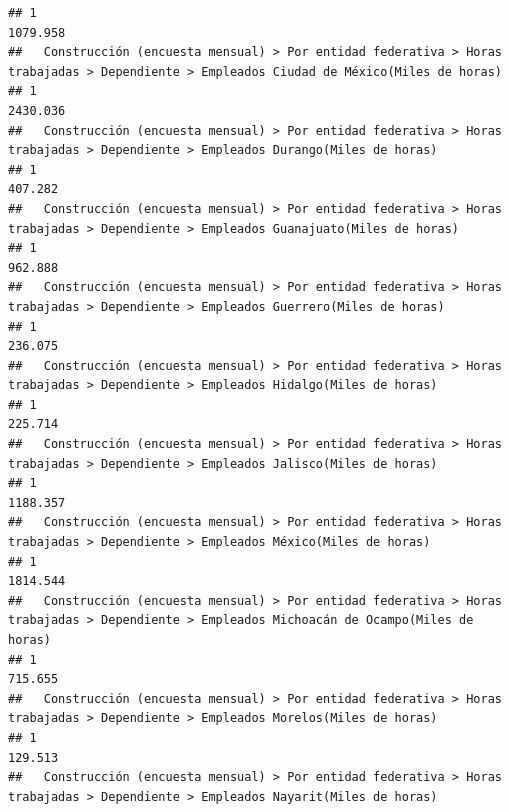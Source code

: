 \documentclass[
]{article}
\begin{document}
\begin{verbatim}
## 1                                                                                                                         1079.958
##   Construcción (encuesta mensual) > Por entidad federativa > Horas trabajadas > Dependiente > Empleados Ciudad de México(Miles de horas) 
## 1                                                                                                                                2430.036
##   Construcción (encuesta mensual) > Por entidad federativa > Horas trabajadas > Dependiente > Empleados Durango(Miles de horas) 
## 1                                                                                                                        407.282
##   Construcción (encuesta mensual) > Por entidad federativa > Horas trabajadas > Dependiente > Empleados Guanajuato(Miles de horas) 
## 1                                                                                                                           962.888
##   Construcción (encuesta mensual) > Por entidad federativa > Horas trabajadas > Dependiente > Empleados Guerrero(Miles de horas) 
## 1                                                                                                                         236.075
##   Construcción (encuesta mensual) > Por entidad federativa > Horas trabajadas > Dependiente > Empleados Hidalgo(Miles de horas) 
## 1                                                                                                                        225.714
##   Construcción (encuesta mensual) > Por entidad federativa > Horas trabajadas > Dependiente > Empleados Jalisco(Miles de horas) 
## 1                                                                                                                       1188.357
##   Construcción (encuesta mensual) > Por entidad federativa > Horas trabajadas > Dependiente > Empleados México(Miles de horas) 
## 1                                                                                                                      1814.544
##   Construcción (encuesta mensual) > Por entidad federativa > Horas trabajadas > Dependiente > Empleados Michoacán de Ocampo(Miles de horas) 
## 1                                                                                                                                    715.655
##   Construcción (encuesta mensual) > Por entidad federativa > Horas trabajadas > Dependiente > Empleados Morelos(Miles de horas) 
## 1                                                                                                                        129.513
##   Construcción (encuesta mensual) > Por entidad federativa > Horas trabajadas > Dependiente > Empleados Nayarit(Miles de horas) 

\end{verbatim}
\end{document}
